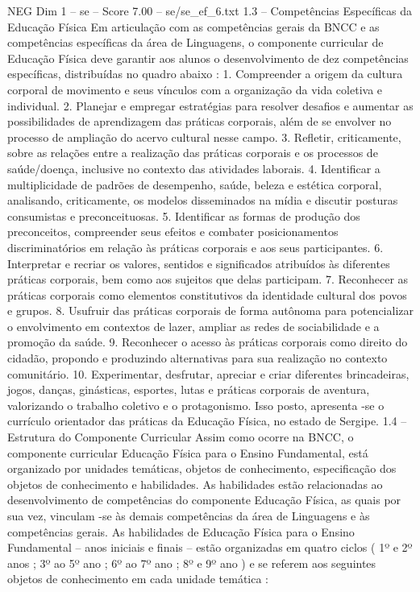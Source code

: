 \begin{textsample}{NEG Dim 1 – se – Score 7.00 – se/se\_ef\_6.txt}  \label{ex:f1_neg_205}
1.3 – Competências Específicas da Educação Física Em articulação com as competências gerais da BNCC e as competências específicas da área de Linguagens, o componente curricular de Educação Física deve garantir aos alunos o desenvolvimento de dez competências específicas, distribuídas no quadro abaixo : 1.
Compreender a origem da cultura corporal de movimento e seus vínculos com a organização da vida coletiva e individual. 2.
Planejar e empregar estratégias para resolver desafios e aumentar as possibilidades de aprendizagem das práticas corporais, além de se envolver no processo de ampliação do acervo cultural nesse campo. 3.
Refletir, criticamente, sobre as relações entre a realização das práticas corporais e os processos de saúde/doença, inclusive no contexto das atividades laborais. 4.
Identificar a multiplicidade de padrões de desempenho, saúde, beleza e estética corporal, analisando, criticamente, os modelos disseminados na mídia e discutir posturas consumistas e preconceituosas. 5.
Identificar as formas de produção dos preconceitos, compreender seus efeitos e combater posicionamentos discriminatórios em relação às práticas corporais e aos seus participantes. 6.
Interpretar e recriar os valores, sentidos e significados atribuídos às diferentes práticas corporais, bem como aos sujeitos que delas participam. 7.
Reconhecer as práticas corporais como elementos constitutivos da identidade cultural dos povos e grupos. 8.
Usufruir das práticas corporais de forma autônoma para potencializar o envolvimento em contextos de lazer, ampliar as redes de sociabilidade e a promoção da saúde. 9.
Reconhecer o acesso às práticas corporais como direito do cidadão, propondo e produzindo alternativas para sua realização no contexto comunitário. 10.
Experimentar, desfrutar, apreciar e criar diferentes brincadeiras, jogos, danças, ginásticas, esportes, lutas e práticas corporais de aventura, valorizando o trabalho coletivo e o protagonismo.
Isso posto, apresenta -se o currículo orientador das práticas da Educação Física, no estado de Sergipe. 1.4 – Estrutura do Componente Curricular Assim como ocorre na BNCC, o componente curricular Educação Física para o Ensino Fundamental, está organizado por unidades temáticas, objetos de conhecimento, especificação dos objetos de conhecimento e habilidades.
As habilidades estão relacionadas ao desenvolvimento de competências do componente Educação Física, as quais por sua vez, vinculam -se às demais competências da área de Linguagens e às competências gerais.
As habilidades de Educação Física para o Ensino Fundamental – anos iniciais e finais – estão organizadas em quatro ciclos ( 1º e 2º anos ; 3º ao 5º ano ; 6º ao 7º ano ; 8º e 9º ano ) e se referem aos seguintes objetos de conhecimento em cada unidade temática :

\end{textsample}
